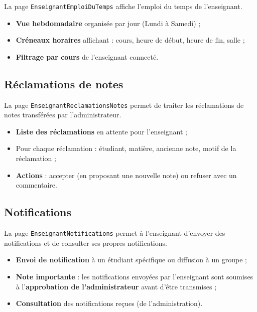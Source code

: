 La page \texttt{EnseignantEmploiDuTemps} affiche l'emploi du temps de l'enseignant.

\begin{itemize}[noitemsep]
    \item \textbf{Vue hebdomadaire} organisée par jour (Lundi à Samedi) ;
    \item \textbf{Créneaux horaires} affichant : cours, heure de début, heure de fin, salle ;
    \item \textbf{Filtrage par cours} de l'enseignant connecté.
\end{itemize}

\subsection{Réclamations de notes}

La page \texttt{EnseignantReclamationsNotes} permet de traiter les réclamations de notes transférées par l'administrateur.

\begin{itemize}[noitemsep]
    \item \textbf{Liste des réclamations} en attente pour l'enseignant ;
    \item Pour chaque réclamation : étudiant, matière, ancienne note, motif de la réclamation ;
    \item \textbf{Actions} : accepter (en proposant une nouvelle note) ou refuser avec un commentaire.
\end{itemize}

\subsection{Notifications}

La page \texttt{EnseignantNotifications} permet à l'enseignant d'envoyer des notifications et de consulter ses propres notifications.

\begin{itemize}[noitemsep]
    \item \textbf{Envoi de notification} à un étudiant spécifique ou diffusion à un groupe ;
    \item \textbf{Note importante} : les notifications envoyées par l'enseignant sont soumises à l'\textbf{approbation de l'administrateur} avant d'être transmises ;
    \item \textbf{Consultation} des notifications reçues (de l'administration).
\end{itemize}

